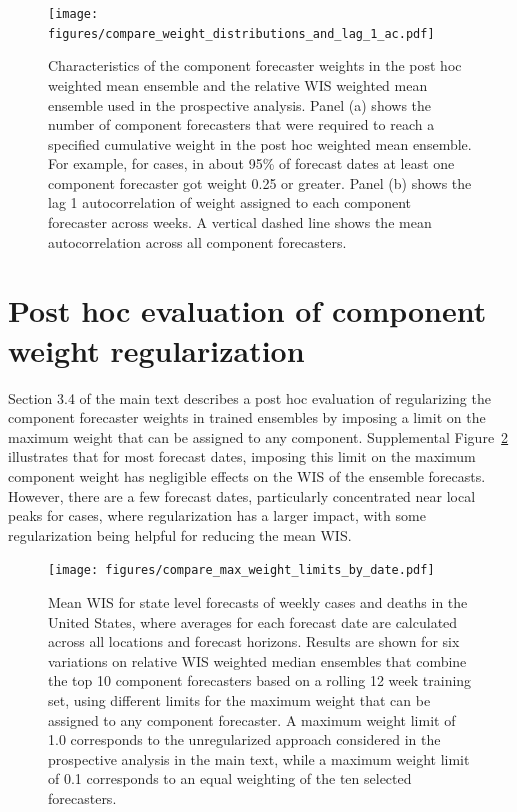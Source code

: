 \documentclass{article}
\begin{document}
\begin{figure}
  \texttt{[image: figures/compare\_weight\_distributions\_and\_lag\_1\_ac.pdf]}
  \caption{Characteristics of the component forecaster weights in the post hoc weighted mean ensemble and the relative WIS weighted mean ensemble used in the prospective analysis. Panel (a) shows the number of component forecasters that were required to reach a specified cumulative weight in the post hoc weighted mean ensemble. For example, for cases, in about 95\% of forecast dates at least one component forecaster got weight 0.25 or greater. Panel (b) shows the lag 1 autocorrelation of weight assigned to each component forecaster across weeks. A vertical dashed line shows the mean autocorrelation across all component forecasters.}
  \label{fig:post_hoc_weight_characteristics}
\end{figure}

\newpage

\section{Post hoc evaluation of component weight regularization}

Section 3.4 of the main text describes a post hoc evaluation of regularizing the component forecaster weights in trained ensembles by imposing a limit on the maximum weight that can be assigned to any component. Supplemental Figure~\ref{fig:compare_max_weight_limits_by_date} illustrates that for most forecast dates, imposing this limit on the maximum component weight has negligible effects on the WIS of the ensemble forecasts. However, there are a few forecast dates, particularly concentrated near local peaks for cases, where regularization has a larger impact, with some regularization being helpful for reducing the mean WIS.

\begin{figure}
  \texttt{[image: figures/compare\_max\_weight\_limits\_by\_date.pdf]}
  \caption{Mean WIS for state level forecasts of weekly cases and deaths in the United States, where averages for each forecast date are calculated across all locations and forecast horizons. Results are shown for six variations on relative WIS weighted median ensembles that combine the top 10 component forecasters based on a rolling 12 week training set, using different limits for the maximum weight that can be assigned to any component forecaster. A maximum weight limit of 1.0 corresponds to the unregularized approach considered in the prospective analysis in the main text, while a maximum weight limit of 0.1 corresponds to an equal weighting of the ten selected forecasters.}
  \label{fig:compare_max_weight_limits_by_date}
\end{figure}
\end{document}

